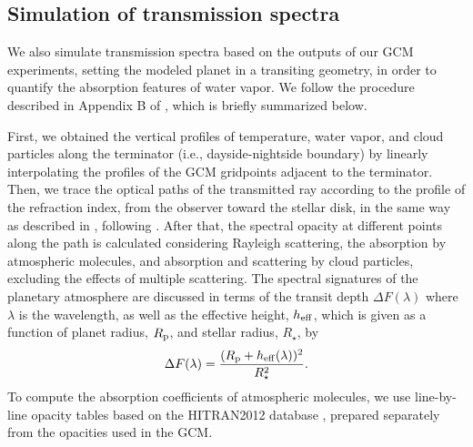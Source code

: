 \documentclass[11pt,numberedappendix,twocolappendix,]{emulateapj}
\def\wv{water vapor}
\begin{document}
\subsection{Simulation of transmission spectra}
\label{ss:method_TransmissionSpectra}

We also simulate transmission spectra based on the outputs of our GCM experiments, setting the modeled planet in a transiting geometry, in order to quantify the absorption features of \wv{}.  
We follow the procedure described in Appendix B of \citet{Way2017}, which is briefly summarized below. 

First, we obtained the vertical profiles of temperature, water vapor, and cloud particles along the terminator (i.e., dayside-nightside boundary) by linearly interpolating the profiles of the GCM gridpoints adjacent to the terminator. 
Then, we trace the optical paths of the transmitted ray according to the profile of the refraction index, from the observer toward the stellar disk, in the same way as described in \citet{vanderWerf2008}, following \citet{Misra2014}. 
After that, the spectral opacity at different points along the path is calculated considering Rayleigh scattering, the absorption by atmospheric molecules, and absorption and scattering by cloud particles, excluding the effects of multiple scattering. 
The spectral signatures of the planetary atmosphere are discussed in terms of the transit depth $\Delta F(\lambda )$ where $\lambda $ is the wavelength, as well as the effective height, $h_{\rm eff}$, which is given as a function of planet radius, $R_{\rm p}$, and stellar radius, $R_{\star }$, by 
\begin{equation}
\Delta F(\lambda) = \frac{( R_{\rm p} + h_{\rm eff}(\lambda)  )^2}{R_{\star }^2}. 
\end{equation}
To compute the absorption coefficients of atmospheric molecules, we use line-by-line opacity tables based on the HITRAN2012 database \citep{Rothman2013}, prepared separately from the opacities used in the GCM. 

\end{document}
